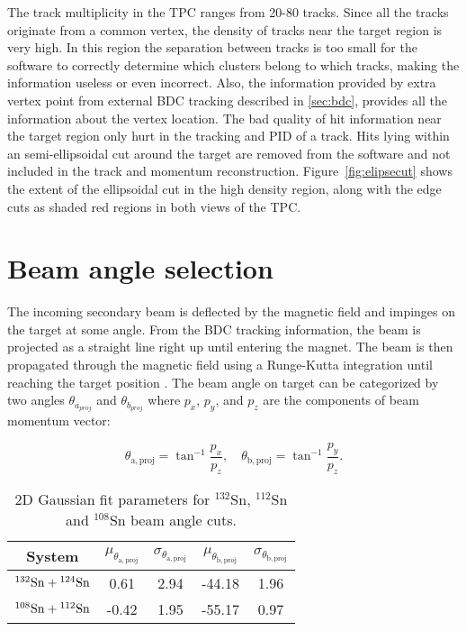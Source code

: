 The track multiplicity in the TPC ranges from 20-80 tracks. Since all the tracks originate from a common vertex, the density of tracks near the target region is very high. In this region the separation between tracks is too small for the software to correctly determine which clusters belong to which tracks, making the information useless or even incorrect. Also, the information provided by extra vertex point from external BDC tracking described in \ref{sec:bdc}, provides all the information about the vertex location. The bad quality of hit information near the target region only hurt in the tracking and PID of a track. Hits lying within an semi-ellipsoidal cut around the target are removed from the software and not included in the track and momentum reconstruction. Figure~\ref{fig:elipsecut} shows the extent of the ellipsoidal cut in the high density region, along with the edge cuts as shaded red regions in both views of the TPC. 

\section{Beam angle selection}
\label{sec:beamangle}
The incoming secondary beam is deflected by the magnetic field and impinges on the target at some angle. From the BDC tracking information, the beam is projected as a straight line right up until entering the magnet.  The beam is then propagated through the magnetic field using a Runge-Kutta integration until reaching the target position \cite{jon}. The beam angle on target can be categorized by two angles $\theta_{a_{proj}}$ and $\theta_{b_{proj}}$ where $p_x$, $p_y$, and $p_z$ are the components of beam momentum vector:


\begin{equation}
  \theta_\mathrm{a,proj}=\tan^{-1}\frac{p_x}{p_z},\quad
  \theta_\mathrm{b,proj}=\tan^{-1}\frac{p_y}{p_z}.
  \label{beamAngle}
\end{equation}





\begin{table}[!htb]
  \begin{center}
    \begin{tabular}{ccccc}
      \hline 
      System & $\mu_{\theta_\mathrm{a,proj}}$ &
      $\sigma_{\theta_\mathrm{a,proj}}$ & $\mu_{\theta_\mathrm{b,proj}}$ &
      $\sigma_{\theta_\mathrm{b,proj}}$ \\
      \hline\hline 
      ${}^{132}\mathrm{Sn} + {}^{124}\mathrm{Sn}$ & 0.61 & 2.94 & -44.18 & 1.96 \\
      ${}^{108}\mathrm{Sn} + {}^{112}\mathrm{Sn}$ & -0.42 & 1.95 & -55.17 & 0.97 \\
      \hline
    \end{tabular}
    \caption{2D Gaussian fit parameters for $^{132}$Sn, $^{112}$Sn and
      $^{108}$Sn beam angle cuts. \label{beamAngleParameters}}
  \end{center}
\end{table}

